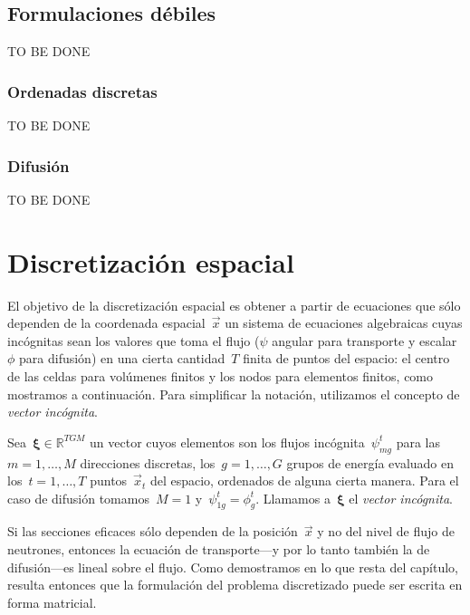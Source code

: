 \subsection{Formulaciones débiles} %
\label{sec:debiles}

{\color{red}TO BE DONE}

\subsubsection{Ordenadas discretas} %

{\color{red}TO BE DONE}

\subsubsection{Difusión} %

{\color{red}TO BE DONE}

\section{Discretización espacial} %
\label{sec:discretizacion_espacial}
El objetivo de la discretización espacial es obtener a partir de ecuaciones que sólo dependen de la coordenada espacial~$\vec{x}$ un sistema de ecuaciones algebraicas cuyas incógnitas sean los valores que toma el flujo ($\psi$ angular para transporte y escalar~$\phi$ para difusión) en una cierta cantidad~$T$ finita de puntos del espacio: el centro de las celdas para volúmenes finitos y los nodos para elementos finitos, como mostramos a continuación. Para simplificar la notación, utilizamos el concepto de \emph{vector incógnita}.

\begin{definicion}
Sea~$\boldsymbol{\xi} \in \mathbb{R}^{TGM}$ un vector cuyos elementos son los flujos incógnita~$\psi_{mg}^t$ para las~$m=1,\dots,M$ direcciones discretas, los~$g=1,\dots,G$ grupos de energía evaluado en los~$t=1,\dots,T$ puntos~$\vec{x}_t$ del espacio, ordenados de alguna cierta manera. Para el caso de difusión tomamos~$M=1$ y~$\psi_{1g}^t = \phi_{g}^t$. Llamamos a~$\boldsymbol{\xi}$ el \emph{vector incógnita}. 
\end{definicion}

Si las secciones eficaces sólo dependen de la posición~$\vec{x}$ y no del nivel de flujo de neutrones, entonces la ecuación de transporte---y por lo tanto también la de difusión---es lineal sobre el flujo. Como demostramos en lo que resta del capítulo, resulta entonces que la formulación del problema discretizado puede ser escrita en forma matricial.

